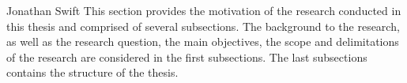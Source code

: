 \hfill {}

\hfill Jonathan Swift
%
This section provides the motivation of the research conducted in this thesis and comprised of 
several subsections.
%
The background to the research, as well as the research question, the main objectives, the scope 
and delimitations of the research are considered in the first subsections.
%
The last subsections contains the structure of the thesis.